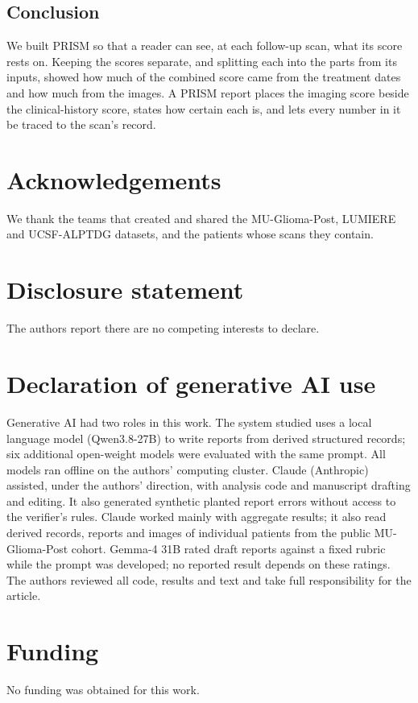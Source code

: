 \documentclass[largeformat]{interact} %
\begin{document}
\subsection*{Conclusion}

We built PRISM so that a reader can see, at each follow-up scan, what its score rests on. Keeping the scores separate,
and splitting each into the parts from its inputs, showed how much of the combined score came from the treatment dates
and how much from the images. A PRISM report places the imaging score beside the
clinical-history score, states how certain each is, and lets every number in it be traced to the scan's record.

\section*{Acknowledgements}
We thank the teams that created and shared the MU-Glioma-Post, LUMIERE and UCSF-ALPTDG datasets, and the patients
whose scans they contain.

\section*{Disclosure statement}
The authors report there are no competing interests to declare.

\section*{Declaration of generative AI use}
Generative AI had two roles in this work. The system studied uses a local
language model (Qwen3.8-27B) to write reports from derived structured records; six additional open-weight models were
evaluated with the same prompt. All models ran offline on the authors' computing cluster. Claude (Anthropic) assisted,
under the authors' direction, with analysis code and manuscript drafting and editing. It also generated synthetic
planted report errors without access to the verifier's rules. Claude worked mainly with aggregate results; it also
read derived records, reports and images of individual patients from the public MU-Glioma-Post cohort. Gemma-4 31B rated draft reports against a fixed rubric while the prompt was developed; no reported result depends on these ratings. The authors
reviewed all code, results and text and take full responsibility for the article.

\section*{Funding}
No funding was obtained for this work.
\end{document}
